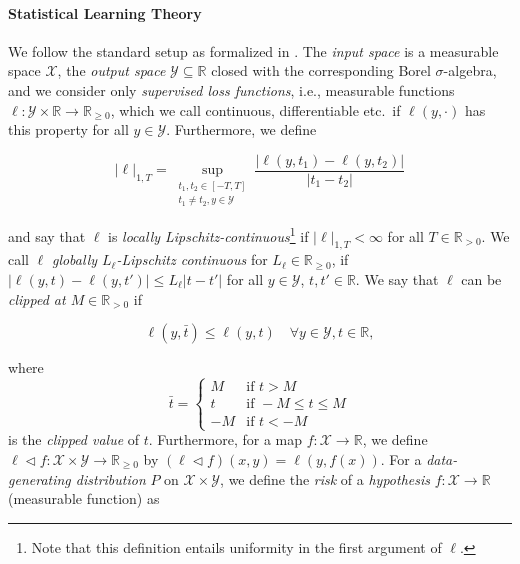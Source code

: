 \documentclass[letterpaper]{article} %
\newcommand{\R}{\mathbb{R}}
\newcommand{\Rnn}{\R_{\geq 0}}
\newcommand{\Rp}{\R_{> 0}}
\newcommand{\inputSet}{\mathcal{X}} %
\newcommand{\outputSet}{\mathcal{Y}} %
\newcommand{\LocLip}[2]{|#1|_{1,{#2}}} %
\newcommand{\pipe}{\lhd}
\newcommand{\clipped}[1]{\bar{#1}}
\newcommand{\defm}[1]{\emph{#1}}
\newcommand{\clipValue}{M}
\newif\ifNotMuchSpace
\begin{document}
\paragraph{Statistical Learning Theory}
We follow the standard setup as formalized in \cite[Chapters~2,~6]{SC08}.
The \defm{input space} is a measurable space $\inputSet$,
the \defm{output space} $\outputSet\subseteq\R$ closed with the corresponding Borel $\sigma$-algebra,
and we consider only \defm{supervised loss functions}, i.e., measurable functions $\ell:\outputSet\times\R\rightarrow\Rnn$,
which we call continuous, differentiable etc.\ if $\ell(y,\cdot)$ has this property for all $y\in\outputSet$.
Furthermore, we define
\ifNotMuchSpace
$\LocLip{\ell}{T}=\sup\{|\ell(y,t_1)-\ell(y,t_2)|/|t_1-t_2| \mid t_1,t_2\in[-T,T], t_1\not=t_2, y\in\outputSet\}$
\else
\begin{equation*}
    \LocLip{\ell}{T}=\sup_{\substack{t_1,t_2\in[-T,T]\\t_1\not=t_2,y\in\outputSet}} \frac{|\ell(y,t_1)-\ell(y,t_2)|}{|t_1-t_2|}
\end{equation*}
\fi
and say that $\ell$ is \defm{locally Lipschitz-continuous}\footnote{Note that this definition entails uniformity in the first argument of $\ell$.} if $\LocLip{\ell}{T}<\infty$ for all $T\in\Rp$.
We call $\ell$ \defm{globally $L_\ell$-Lipschitz continuous} for $L_\ell\in\Rnn$, if $|\ell(y,t)-\ell(y,t')|\leq L_\ell|t-t'|$ for all $y\in\outputSet$, $t,t'\in\R$.
We say that $\ell$ can be \defm{clipped at $\clipValue\in\Rp$} if
\ifNotMuchSpace
$\ell(y,\clipped{t}) \leq \ell(x,y,t)$ for all $y\in\outputSet, t\in\R$,
\else
\begin{equation*}
    \ell(y,\clipped{t}) \leq \ell(y,t) \quad \forall y\in\outputSet, t\in\R,
\end{equation*}
\fi
where
\begin{equation*}
    \clipped{t} = \begin{cases}
        \clipValue & \text{if } t > M \\
        t & \text{if } -M \leq t \leq M \\
        -\clipValue & \text{if } t < -M
    \end{cases}
\end{equation*}
is the \defm{clipped value} of $t$.
Furthermore, for a map $f: \inputSet \rightarrow\R$, we define $\ell \pipe f: \inputSet \times\outputSet \rightarrow \Rnn$ by $(\ell \pipe f)(x,y) = \ell(y,f(x))$.
For a \defm{data-generating distribution} $P$ on $\inputSet\times\outputSet$, 
we define the \defm{risk} of a \defm{hypothesis} $f:\inputSet\rightarrow\R$ (measurable function) as
\end{document}
